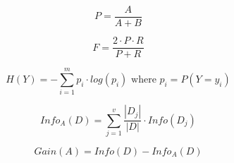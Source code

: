 \documentclass[10pt]{book}
\begin{document}
\begin{mdSnippets}
\begin{mdDisplaySnippet}
\[%
  P = \frac{A}{A+B}
\]%
\end{mdDisplaySnippet}%
\begin{mdDisplaySnippet}[ed20a79ddbdd6c86e3ce04fd31c21666]%
\[%
  F = \frac{2 \cdot P \cdot R}{P + R}
\]%
\end{mdDisplaySnippet}%
\begin{mdDisplaySnippet}[3274f67c0f14a01faf1c72d1c8c33393]%
\[%
H(Y) = -\sum_{i=1}^m p_i \cdot log(p_i) \text{ where } p_i = P(Y=y_i)
\]%
\end{mdDisplaySnippet}%
\begin{mdDisplaySnippet}%
\[%
  Info_A(D) = \sum_{j=1}^{v} \frac{|D_j|}{|D|} \cdot Info(D_j)
\]%
\end{mdDisplaySnippet}%
\begin{mdDisplaySnippet}[9b503ca4d3347f05c2988351b9a864aa]%
\[%
  Gain(A) = Info(D) - Info_A(D)
\]%
\end{mdDisplaySnippet}%

\end{mdSnippets}
\end{document}
